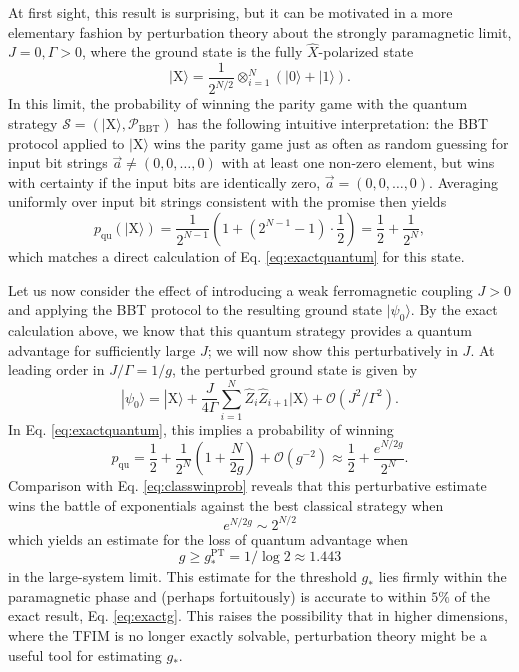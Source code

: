 \documentclass[prb,twocolumn,showpacs,amssymb,superscriptaddress]{revtex4-2}
\begin{document}
At first sight, this result is surprising, but it can be motivated in a more elementary fashion by perturbation theory about the strongly paramagnetic limit, $J=0, \Gamma>0$, where the ground state is the fully $\hat{X}$-polarized state 
\begin{equation}
|\mathrm{X}\rangle = \frac{1}{2^{N/2}} \otimes_{i=1}^N (|0\rangle + |1\rangle).
\end{equation}
In this limit, the probability of winning the parity game with the quantum strategy $\mathcal{S} = (|\mathrm{X}\rangle, \mathcal{P}_{\mathrm{BBT}})$ has the following intuitive interpretation: the BBT protocol applied to $|\mathrm{X}\rangle$ wins the parity game just as often as random guessing for input bit strings $\vec{a} \neq (0,0,\ldots,0)$ with at least one non-zero element, but wins with certainty if the input bits are identically zero, $\vec{a} = (0,0,\ldots,0)$. Averaging uniformly over input bit strings consistent with the promise then yields
\begin{equation}
p_{\mathrm{qu}}(|\mathrm{X}\rangle) = \frac{1}{2^{N-1}}\left(1+(2^{N-1}-1)\cdot \frac{1}{2}\right) = \frac{1}{2} + \frac{1}{2^N},
\end{equation}
which matches a direct calculation of Eq. \eqref{eq:exactquantum} for this state. 

Let us now consider the effect of introducing a weak ferromagnetic coupling $J>0$ and applying the BBT protocol to the resulting ground state $|\psi_0\rangle$. By the exact calculation above, we know that this quantum strategy provides a quantum advantage for sufficiently large $J$; we will now show this perturbatively in $J$. At leading order in $J/\Gamma = 1/g$, the perturbed ground state is given by
\begin{equation}
|\psi_{0}\rangle = |\mathrm{X}\rangle + \frac{J}{4\Gamma} \sum_{i=1}^N \hat{Z}_{i} \hat{Z}_{i+1} |\mathrm{X}\rangle + \mathcal{O}(J^2/\Gamma^2).
\end{equation}
In Eq. \eqref{eq:exactquantum}, this implies a probability of winning
\begin{equation}
p_{\mathrm{qu}} = \frac{1}{2} + \frac{1}{2^N}\left(1+\frac{N}{2g}\right) + \mathcal{O}(g^{-2}) \approx \frac{1}{2} + \frac{e^{N/2g}}{2^N}.
\end{equation}
Comparison with Eq. \eqref{eq:classwinprob} reveals that this perturbative estimate wins the battle of exponentials against the best classical strategy when
\begin{equation}
e^{N/2g} \sim 2^{N/2}
\end{equation}
which yields an estimate for the loss of quantum advantage when
\begin{equation}
g \geq g^{\mathrm{PT}}_* = 1/\log{2} \approx 1.443
\end{equation}
in the large-system limit. This estimate for the threshold $g_*$ lies firmly within the paramagnetic phase and (perhaps fortuitously) is accurate to within $5\%$ of the exact result, Eq. \eqref{eq:exactg}. This raises the possibility that in higher dimensions, where the TFIM is no longer exactly solvable, perturbation theory might be a useful tool for estimating $g_*$.
\end{document}
